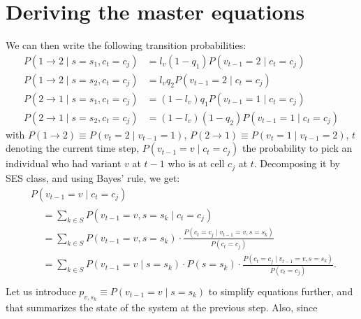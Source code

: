 \documentclass[../thesis.tex]{subfiles}
\begin{document}
\section{Deriving the master equations}
We can then write the following transition probabilities:
\begin{equation}
    \label{eq:first_trans_probs}
    \begin{aligned}
        P(1 \rightarrow 2 \mid s = s_1, c_t = c_j)
            &= l_v (1 - q_1) P(v_{t-1} = 2 \mid c_t = c_j)
        \\
        P(1 \rightarrow 2 \mid s = s_2, c_t = c_j)
            &= l_v q_2 P(v_{t-1} = 2 \mid c_t = c_j)
        \\
        P(2 \rightarrow 1 \mid s = s_1, c_t = c_j)
            &= (1 - l_v) q_1 P(v_{t-1} = 1 \mid c_t = c_j)
        \\
        P(2 \rightarrow 1 \mid s = s_2, c_t = c_j)
            &= (1 - l_v) (1 - q_2) P(v_{t-1} = 1 \mid c_t = c_j)
    \end{aligned}
\end{equation}
with $P(1 \rightarrow 2) \equiv P(v_t = 2 \mid v_{t-1} = 1)$, $P(2 \rightarrow 1) \equiv
P(v_t = 1 \mid v_{t-1} = 2)$, $t$ denoting the current time step, $P(v_{t-1} = v \mid
c_t = c_j)$ the probability to pick an individual who had variant $v$ at $t-1$ who is at
cell $c_j$ at $t$. Decomposing it by \ac{SES} class, and using Bayes' rule, we get:
\begin{equation}
    \begin{aligned}
        &P(v_{t-1} = v \mid c_t = c_j)
        \\[1ex]
        &
        \begin{aligned}
            & = \sum_{k \in S} P(v_{t-1} = v, s = s_k \mid c_t = c_j) \\
            &= \sum_{k \in S} P(v_{t-1} = v, s = s_k)
                \cdot \frac{P(c_t = c_j \mid v_{t-1} = v, s = s_k)}{P(c_t = c_j)} \\
            &= \sum_{k \in S} P(v_{t-1} = v \mid s = s_k)
                \cdot P(s = s_k)
                \cdot \frac{P(c_t = c_j \mid v_{t-1} = v, s = s_k)}{P(c_t = c_j)}. \\
        \end{aligned}
    \end{aligned}
\end{equation}
Let us introduce $p_{v, s_k} \equiv P(v_{t-1} = v \mid s = s_k)$ to simplify equations
further, and that summarizes the state of the system at the previous step. Also, since
\end{document}
